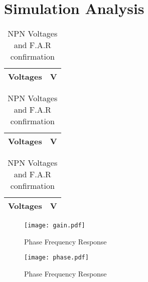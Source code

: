 \section{Simulation Analysis}
\label{sec:simulation}


\begin{table}[H]
  \centering
  \begin{tabular}{|l|r|}
    \hline    
    {\bf Voltages} & {\bf V} \\ \hline
    
  \end{tabular}
  \caption{NPN Voltages and F.A.R confirmation}
  \label{tab1:npn}
\end{table}


\begin{table}[H]
  \centering
  \begin{tabular}{|l|r|}
    \hline    
    {\bf Voltages} & {\bf V} \\ \hline
    
  \end{tabular}
  \caption{NPN Voltages and F.A.R confirmation}
  \label{tab2:npn}
\end{table}


\begin{table}[H]
  \centering
  \begin{tabular}{|l|r|}
    \hline    
    {\bf Voltages} & {\bf V} \\ \hline
    
  \end{tabular}
  \caption{NPN Voltages and F.A.R confirmation}
  \label{tab3:npn}
\end{table}

\begin{figure}[H] \centering
 \texttt{[image: gain.pdf]}
 \caption{Phase Frequency Response}                         %
\label{fig:phase}
\end{figure}

\begin{figure}[H] \centering
 \texttt{[image: phase.pdf]}
 \caption{Phase Frequency Response}                         %
\label{fig:phase}
\end{figure}

%    
%    
%    

